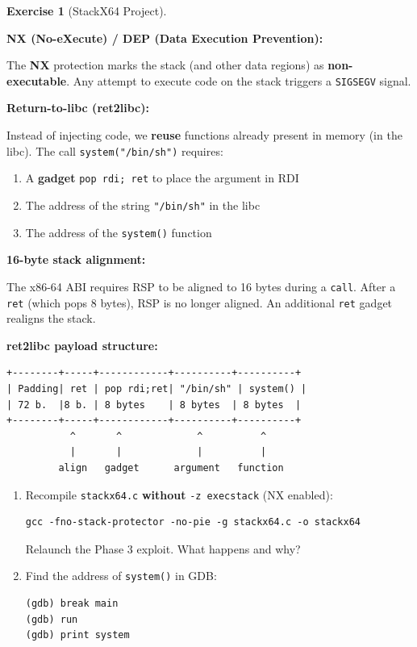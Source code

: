 \documentclass[a4paper,11pt]{article}
\theoremstyle{plain}
\theoremstyle{definition}
\newtheorem{exercice}{Exercise}
\begin{document}
\begin{exercice}[StackX64 Project]
\begin{rappel}
\textbf{NX (No-eXecute) / DEP (Data Execution Prevention):}

The \textbf{NX} protection marks the stack (and other data regions) as \textbf{non-executable}. Any attempt to execute code on the stack triggers a \texttt{SIGSEGV} signal.

\medskip
\textbf{Return-to-libc (ret2libc):}

Instead of injecting code, we \textbf{reuse} functions already present in memory (in the libc). The call \texttt{system("/bin/sh")} requires:
\begin{enumerate}
    \item A \textbf{gadget} \texttt{pop rdi; ret} to place the argument in RDI
    \item The address of the string \texttt{"/bin/sh"} in the libc
    \item The address of the \texttt{system()} function
\end{enumerate}

\medskip
\textbf{16-byte stack alignment:}

The x86-64 ABI requires RSP to be aligned to 16 bytes during a \texttt{call}. After a \texttt{ret} (which pops 8 bytes), RSP is no longer aligned. An additional \texttt{ret} gadget realigns the stack.

\medskip
\textbf{ret2libc payload structure:}
\begin{lstlisting}[style=GDBStyle]
+--------+-----+------------+----------+----------+
| Padding| ret | pop rdi;ret| "/bin/sh" | system() |
| 72 b.  |8 b. | 8 bytes    | 8 bytes  | 8 bytes  |
+--------+-----+------------+----------+----------+
           ^       ^             ^          ^
           |       |             |          |
         align   gadget      argument   function
\end{lstlisting}
\end{rappel}

\begin{enumerate}
\item[\textbf{4a)}] Recompile \texttt{stackx64.c} \textbf{without} \texttt{-z execstack} (NX enabled):
\begin{lstlisting}[style=GDBStyle]
gcc -fno-stack-protector -no-pie -g stackx64.c -o stackx64
\end{lstlisting}
Relaunch the Phase 3 exploit. What happens and why?

\item[\textbf{4b)}] Find the address of \texttt{system()} in GDB:
\begin{lstlisting}[style=GDBStyle]
(gdb) break main
(gdb) run
(gdb) print system
\end{lstlisting}


\end{enumerate}
\end{exercice}
\end{document}
